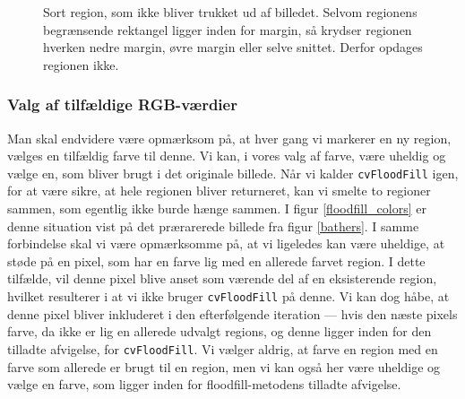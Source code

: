 {\begin{figure}[h]
    \setlength\fboxsep{0pt}
    \setlength\fboxrule{0.5pt}
    \centering
    \caption[]{Sort region, som ikke bliver trukket ud af billedet.
    Selvom regionens begrænsende rektangel ligger inden for margin, så
    krydser regionen hverken nedre margin, øvre margin eller selve
    snittet. Derfor opdages regionen ikke.}
    \label{respect_to_cut}
\end{figure}

\subsubsection{Valg af tilfældige RGB-værdier}
Man skal endvidere være opmærksom på, at hver gang vi markerer en ny
region, vælges en tilfældig farve til denne.  Vi kan, i vores valg af
farve, være uheldig og vælge en, som bliver brugt i det originale
billede. Når vi kalder \texttt{cvFloodFill} igen, for at være sikre, at
hele regionen bliver returneret, kan vi smelte to regioner sammen, som
egentlig ikke burde hænge sammen. I figur \ref{floodfill_colors} er
denne situation vist på det prærarerede billede fra figur \ref{bathers}.
I samme forbindelse skal vi være opmærksomme på, at vi ligeledes kan
være uheldige, at støde på en pixel, som har en farve lig med en
allerede farvet region. I dette tilfælde, vil denne pixel blive anset
som værende del af en eksisterende region, hvilket resulterer i at vi
ikke bruger \texttt{cvFloodFill} på denne. Vi kan dog håbe, at denne
pixel bliver inkluderet i den efterfølgende iteration --- hvis den næste
pixels farve, da ikke er lig en allerede udvalgt regions, og denne
ligger inden for den tilladte afvigelse, for \texttt{cvFloodFill}.  Vi
vælger aldrig, at farve en region med en farve som allerede er brugt til
en region, men vi kan også her være uheldige og vælge en farve, som
ligger inden for floodfill-metodens tilladte afvigelse.

}

